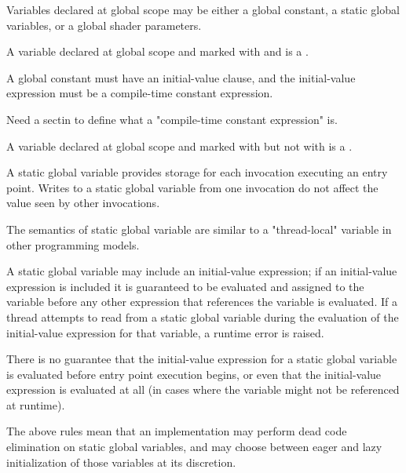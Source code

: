 Variables declared at global scope may be either a global constant, a static global variables, or a global shader parameters.


A variable declared at global scope and marked with  and  is a .

A global constant must have an initial-value clause, and the initial-value expression must be a compile-time constant expression.

\begin{Incomplete}
Need a sectin to define what a "compile-time constant expression" is.
\end{Incomplete}


A variable declared at global scope and marked with  but not with  is a .

A static global variable provides storage for each invocation executing an entry point.
Writes to a static global variable from one invocation do not affect the value seen by other invocations.

\begin{Note}
The semantics of static global variable are similar to a "thread-local" variable in other programming models.
\end{Note}

A static global variable may include an initial-value expression; if an initial-value expression is included it is guaranteed to be evaluated and assigned to the variable before any other expression that references the variable is evaluated.
If a thread attempts to read from a static global variable during the evaluation of the initial-value expression for that variable, a runtime error is raised.

There is no guarantee that the initial-value expression for a static global variable is evaluated before entry point execution begins, or even that the initial-value expression is evaluated at all (in cases where the variable might not be referenced at runtime).

\begin{Note}
The above rules mean that an implementation may perform dead code elimination on static global variables, and may choose between eager and lazy initialization of those variables at its discretion.
\end{Note}

